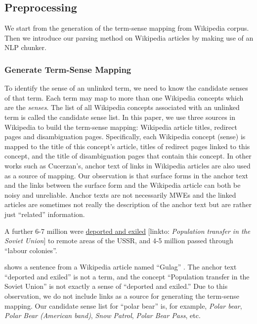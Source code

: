 \subsection{Preprocessing}
We start from the generation
of the term-sense mapping from Wikipedia corpus.
Then we introduce our parsing method on
Wikipedia articles by making use of an NLP chunker.

\subsubsection{Generate Term-Sense Mapping}
To identify the sense of an unlinked term, we need to know the candidate
senses of that term.
Each term may map to more than
one Wikipedia concepts which are the {\em senses}.
The list of all Wikipedia concepts associated with an unlinked term is called
the candidate sense list.
In this paper, we use three sources in Wikipedia to build the
term-sense mapping:
Wikipedia article titles, redirect pages and disambiguation pages.
Specifically, each Wikipedia concept (sense) is mapped to
the title of this concept's article,
titles of redirect pages linked to this concept,
and the title of disambiguation pages that contain this concept.
In other works such as Cucerzan's\cite{cucerzan2007large},
anchor text of links in Wikipedia articles are also used as
a source of mapping.
Our observation is that surface forms in the anchor text and the links
between the surface form and the Wikipedia article can both be
noisy and unreliable. Anchor texts are not necessarily MWEs
and the linked articles are sometimes not really the description of
the anchor text but are rather just ``related'' information.

\begin{example}
\label{ex:wronglink}
A further 6-7 million were {\uline{deported and exiled}}
 [linkto: {\em Population transfer in the Soviet Union}] to remote areas of
the USSR, and 4-5 million passed through ``labour colonies''.
\end{example}

 shows a sentence from a Wikipedia article
named ``Gulag'' \cite{gulag}.
The anchor text ``deported and exiled'' is not a term, and the
concept  ``Population transfer in the Soviet Union'' is not exactly
a sense of ``deported and exiled.''
Due to this observation, we do not include links as a source for
generating the term-sense mapping.
Our candidate sense list for ``polar bear'' is, for example,
{\em Polar bear}, {\em Polar Bear (American band)}, {\em Snow Patrol},
{\em Polar Bear Pass}, etc.


